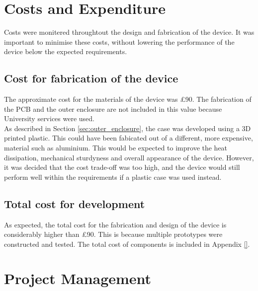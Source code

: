 \documentclass[a4paper,12pt]{article}
\begin{document}



\newpage
\section{Costs and Expenditure}
\label{sec:cost}

Costs were monitered throughtout the design and fabrication of the device. It was important to minimise these costs, without lowering the performance of the device below the expected requirements.

\subsection{Cost for fabrication of the device}
\label{sec:device_cost}

The approximate cost for the materials of the device was £90. The fabrication of the PCB and the outer enclosure are not included in this value because University services were used. \\

As described in Section \ref{sec:outer_enclosure}, the case was developed using a 3D printed plastic. This could have been fabicated out of a different, more expensive, material such as aluminium. This would be expected to improve the heat dissipation, mechanical sturdyness and overall appearance of the device. However, it was decided that the cost trade-off was too high, and the device would still perform well within the requirements if a plastic case was used instead.

\subsection{Total cost for development}
\label{sec:total_cost}

As expected, the total cost for the fabrication and design of the device is considerably higher than £90. This is because multiple prototypes were constructed and tested. The total cost of components is included in Appendix \ref{}.


\newpage
\section{Project Management}
\label{sec:project_management}
\end{document}
